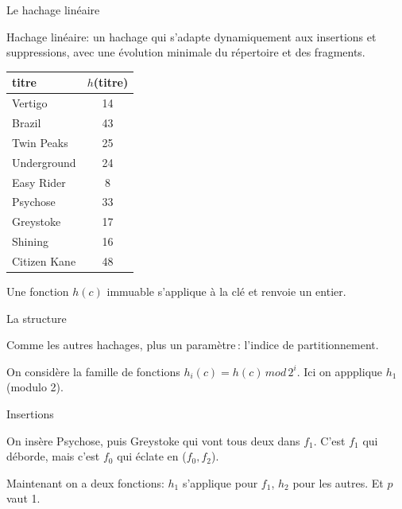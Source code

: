 

\begin{frame}{Le hachage linéaire}

Hachage linéaire: un hachage qui s'adapte dynamiquement aux insertions
et suppressions, avec une \alert{évolution minimale} du répertoire
et des fragments.

\vfill

\begin{tabular}{l|c}
titre & $h$(titre)   \\
\hline
Vertigo     & 14  \\
Brazil      & 43  \\
Twin Peaks  & 25  \\
Underground & 24  \\
Easy Rider  & 8 \\
Psychose    &  33 \\
Greystoke   &  17 \\
Shining     &  16 \\
Citizen Kane     &  48 \\\hline
\end{tabular}

\vfill
Une fonction $h(c)$ immuable 
s'applique à la clé et renvoie un entier.
\end{frame}
\begin{frame}{La structure}

Comme les autres hachages, plus un paramètre\,:  \alert{l'indice de partitionnement}.

\vfill


\vfill
\begin{blocgauche}
On considère la famille de fonctions $h_i (c)  = h(c)\, mod\, 2^i$. Ici
on appplique $h_1$ (modulo 2). 
\end{blocgauche}
\end{frame}

\begin{frame}{Insertions}

On insère Psychose, puis Greystoke qui vont tous deux dans $f_1$.
C'est $f_1$ qui déborde, \alert{mais c'est $f_0$ qui éclate en ($f_0, f_2$)}.
\vfill



\vfill
\begin{blocgauche}
Maintenant on a deux fonctions: $h_1$ s'applique pour $f_1$, $h_2$
pour les autres. Et $p$ vaut 1.
\end{blocgauche}
\end{frame}




